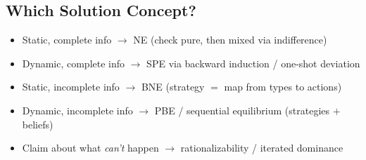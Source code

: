 \subsection{Which Solution Concept?}
\begin{itemize}[nosep]
    \item Static, complete info $\to$ NE (check pure, then mixed via indifference)
    \item Dynamic, complete info $\to$ SPE via backward induction / one-shot deviation
    \item Static, incomplete info $\to$ BNE (strategy $=$ map from types to actions)
    \item Dynamic, incomplete info $\to$ PBE / sequential equilibrium (strategies $+$ beliefs)
    \item Claim about what \textit{can't} happen $\to$ rationalizability / iterated dominance
\end{itemize}
